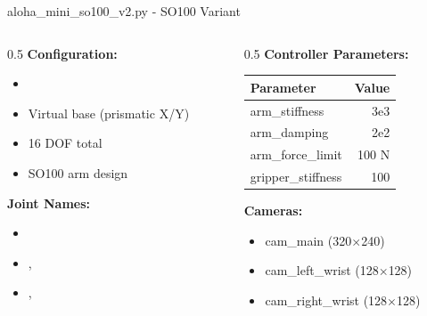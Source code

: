 \begin{frame}{aloha\_mini\_so100\_v2.py - SO100 Variant}
\begin{columns}
\begin{column}{0.5\textwidth}
    \textbf{Configuration:}
    \begin{itemize}
        \item {}
        \item Virtual base (prismatic X/Y)
        \item 16 DOF total
        \item SO100 arm design
    \end{itemize}

    \vspace{0.3cm}

    \textbf{Joint Names:}
    \begin{itemize}
        \item {}
        \item {}, 
        \item {}, 
    \end{itemize}
\end{column}
\begin{column}{0.5\textwidth}
    \textbf{Controller Parameters:}
    \begin{table}
    \centering
    \footnotesize
    \begin{tabular}{lr}
    \toprule
    \textbf{Parameter} & \textbf{Value} \\
    \midrule
    arm\_stiffness & 3e3 \\
    arm\_damping & 2e2 \\
    arm\_force\_limit & 100 N \\
    gripper\_stiffness & 100 \\
    \bottomrule
    \end{tabular}
    \end{table}

    \vspace{0.3cm}

    \textbf{Cameras:}
    \begin{itemize}
        \item cam\_main (320$\times$240)
        \item cam\_left\_wrist (128$\times$128)
        \item cam\_right\_wrist (128$\times$128)
    \end{itemize}
\end{column}
\end{columns}
\end{frame}

